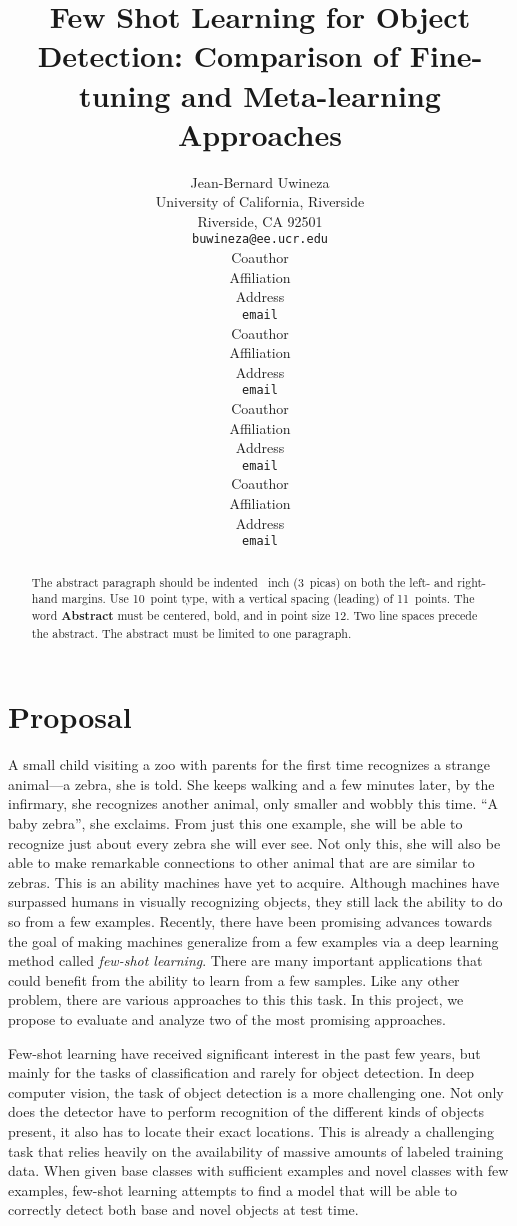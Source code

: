 \documentclass{article}
\title{Few Shot Learning for Object Detection: 
Comparison of Fine-tuning and Meta-learning Approaches}
\author{%
  Jean-Bernard Uwineza 
  \\
  University of California, Riverside\\
  Riverside, CA 92501 \\
  \texttt{buwineza@ee.ucr.edu} \\
  \And
  Coauthor \\
  Affiliation \\
  Address \\
  \texttt{email} \\
  \AND
  Coauthor \\
  Affiliation \\
  Address \\
  \texttt{email} \\
  \And
  Coauthor \\
  Affiliation \\
  Address \\
  \texttt{email} \\
  \And
  Coauthor \\
  Affiliation \\
  Address \\
  \texttt{email} \\
}
\begin{document}
\maketitle

\begin{abstract} %
  The abstract paragraph should be indented ~inch (3~picas) on
  both the left- and right-hand margins. Use 10~point type, with a vertical
  spacing (leading) of 11~points.  The word \textbf{Abstract} must be centered,
  bold, and in point size 12. Two line spaces precede the abstract. The abstract
  must be limited to one paragraph.
\end{abstract}

\section{Proposal}

A small child visiting a zoo with parents for the first time recognizes a strange animal---a zebra, she is told. She keeps walking and a few minutes later, by the infirmary, she recognizes another animal, only smaller and wobbly this time. ``A baby zebra'', she exclaims. From just this one example, she will be able to recognize just about every zebra she will ever see. Not only this, she will also be able to make remarkable connections to other animal that are are similar to zebras. This is an ability machines have yet to acquire. Although machines have surpassed humans in visually recognizing objects, they still lack the ability to do so from a few examples. Recently, there have been promising advances towards the goal of making machines generalize from a few examples via a deep learning method called \textit{few-shot learning}. There are many important applications that could benefit from the ability to learn from a few samples. Like any other problem, there are various approaches to this this task. In this project, we propose to evaluate and analyze two of the most promising approaches. 

Few-shot learning have received significant interest in the past few years, but mainly for the tasks of classification and rarely for object detection. In deep computer vision, the task of object detection is a more challenging one. Not only does the detector have to perform recognition of the different kinds of objects present, it also has to locate their exact locations. This is already a challenging task that relies heavily on the availability of massive amounts of labeled training data. When given base classes with sufficient examples and novel classes with few examples, few-shot learning attempts to find a model that will be able to correctly detect both base and novel objects at test time. 
\end{document}
